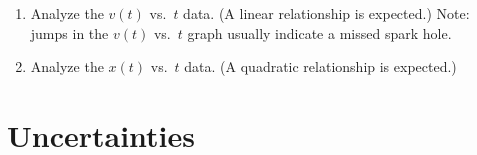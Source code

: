 \begin{enumerate}
\item  Analyze the $v(t)$ vs.\ $t$ data.  (A linear relationship is expected.)
Note: jumps in the $v(t)$ vs.\ $t$ graph usually indicate a missed spark hole.

\item Analyze the $x(t)$ vs.\ $t$ data.  (A quadratic relationship is expected.)


\end{enumerate}

\section*{Uncertainties}


